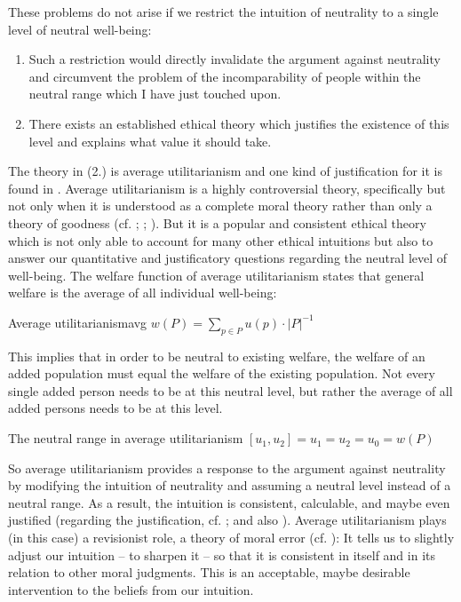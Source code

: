 These problems do not arise if we restrict the intuition of neutrality to a single level of neutral well-being: 
\begin{enumerate}
\item Such a restriction would directly invalidate the argument against neutrality and circumvent the problem of the incomparability of people within the neutral range which I have just touched upon. 
\item There exists an established ethical theory which justifies the existence of this level and explains what value it should take. 
\end{enumerate}
The theory in (2.) is average utilitarianism and one kind of justification for it is found in . Average utilitarianism is a highly controversial theory, specifically but not only when it is understood as a complete moral theory rather than only a theory of goodness (cf. ; ; ). But it is a popular and consistent ethical theory which is not only able to account for many other ethical intuitions but also to answer our quantitative and justificatory questions regarding the neutral level of well-being. The welfare function of average utilitarianism states that general welfare is the average of all individual well-being: 

\begin{Definition}{Average utilitarianism}{avg}
$w(P) = \sum_{p \in P} u(p) \cdot |P|^{-1}$
\end{Definition}

This implies that in order to be neutral to existing welfare, the welfare of an added population must equal the welfare of the existing population. Not every single added person needs to be at this neutral level, but rather the average of all added persons needs to be at this level. 

\begin{Definition}{The neutral range in average utilitarianism}{}
$[u_1, u_2] = u_1 = u_2 = u_0 = w(P)$
\end{Definition}

So average utilitarianism provides a response to the argument against neutrality by modifying the intuition of neutrality and assuming a neutral level instead of a neutral range. As a result, the intuition is consistent, calculable, and maybe even justified (regarding the justification, cf. ; and also ). Average utilitarianism plays (in this case) a revisionist role, a theory of moral error (cf. ): It tells us to slightly adjust our intuition -- to sharpen it -- so that it is consistent in itself and in its relation to other moral judgments. This is an acceptable, maybe desirable intervention to the beliefs from our intuition. 

